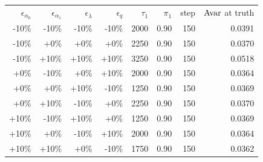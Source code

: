 \begin{tabular}{rrrrrrrr}
\toprule
$\epsilon_{\alpha_0}$ & $\epsilon_{\alpha_1}$ & $\epsilon_{\lambda}$ & $\epsilon_q$ & $\tau_1$ & $\pi_1$ & step & $\mathrm{Avar}$ at truth \\
-10\% & -10\% & -10\% & -10\% & 2000 & 0.90 & 150 & 0.0391 \\
-10\% & +0\% & +0\% & +0\% & 2250 & 0.90 & 150 & 0.0370 \\
-10\% & +10\% & +10\% & +10\% & 3250 & 0.90 & 150 & 0.0518 \\
+0\% & -10\% & +0\% & +10\% & 2000 & 0.90 & 150 & 0.0364 \\
+0\% & +0\% & +10\% & -10\% & 1250 & 0.90 & 150 & 0.0369 \\
+0\% & +10\% & -10\% & +0\% & 2250 & 0.90 & 150 & 0.0370 \\
+10\% & -10\% & +10\% & +0\% & 1250 & 0.90 & 150 & 0.0369 \\
+10\% & +0\% & -10\% & +10\% & 2000 & 0.90 & 150 & 0.0364 \\
+10\% & +10\% & +0\% & -10\% & 1750 & 0.90 & 150 & 0.0362 \\
\bottomrule
\end{tabular}
